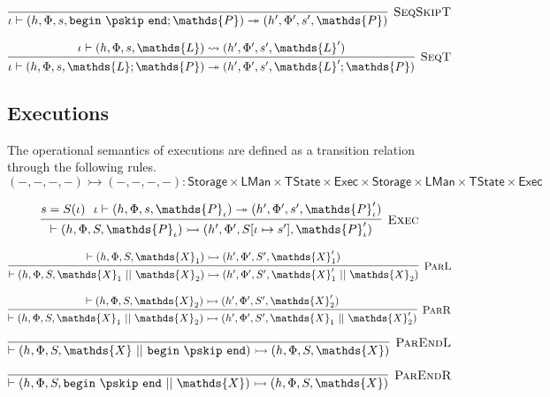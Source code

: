 \[
\infer[\textsc{SeqSkipT}]
{
	\iota \vdash (h, \Phi, s, \mathtt{begin}\ \pskip\ \mathtt{end}; \mathds{P})
	\twoheadrightarrow
	(h', \Phi', s', \mathds{P})
}
{}
\]

\[
\infer[\textsc{SeqT}]
{
	\iota \vdash (h, \Phi, s, \mathds{L}; \mathds{P})
	\twoheadrightarrow
	(h', \Phi', s', \mathds{L}'; \mathds{P})
}
{
	\iota \vdash (h, \Phi, s, \mathds{L})
	\rightsquigarrow
	(h', \Phi', s', \mathds{L}')
}
\]

\subsection{Executions}

The operational semantics of executions are defined as a transition relation through the following rules.
\[ (-, -, -, -) \rightarrowtail (-, -, -, -) : \mathsf{Storage} \times \mathsf{LMan} \times \mathsf{TState} \times \mathsf{Exec} \times \mathsf{Storage} \times \mathsf{LMan} \times \mathsf{TState} \times \mathsf{Exec} \]

\[
\infer[\textsc{Exec}]
{
	\vdash (h, \Phi, S, \mathds{P}_\iota)
	\rightarrowtail
	(h', \Phi', S[\iota \mapsto s'], \mathds{P}_\iota')
}
{
	s = S(\iota)\ \
	\iota \vdash (h, \Phi, s, \mathds{P}_\iota)
	\twoheadrightarrow
	(h', \Phi', s', \mathds{P}_\iota')
}
\]

\[
\infer[\textsc{ParL}]
{
	\vdash (h, \Phi, S, \mathds{X}_1\ ||\ \mathds{X}_2)
	\rightarrowtail
	(h', \Phi', S', \mathds{X}_1'\ ||\ \mathds{X}_2)
}
{
	\vdash (h, \Phi, S, \mathds{X}_1)
	\rightarrowtail
	(h', \Phi', S', \mathds{X}_1')
}
\]

\[
\infer[\textsc{ParR}]
{
	\vdash (h, \Phi, S, \mathds{X}_1\ ||\ \mathds{X}_2)
	\rightarrowtail
	(h', \Phi', S', \mathds{X}_1\ ||\ \mathds{X}_2')
}
{
	\vdash (h, \Phi, S, \mathds{X}_2)
	\rightarrowtail
	(h', \Phi', S', \mathds{X}_2')
}
\]

\[
\infer[\textsc{ParEndL}]
{
	\vdash (h, \Phi, S, \mathds{X}\ ||\ \mathtt{begin}\ \pskip\ \mathtt{end})
	\rightarrowtail
	(h, \Phi, S, \mathds{X})
}
{}
\]

\[
\infer[\textsc{ParEndR}]
{
	\vdash (h, \Phi, S, \mathtt{begin}\ \pskip\ \mathtt{end}\ ||\ \mathds{X})
	\rightarrowtail
	(h, \Phi, S, \mathds{X})
}
{}
\]